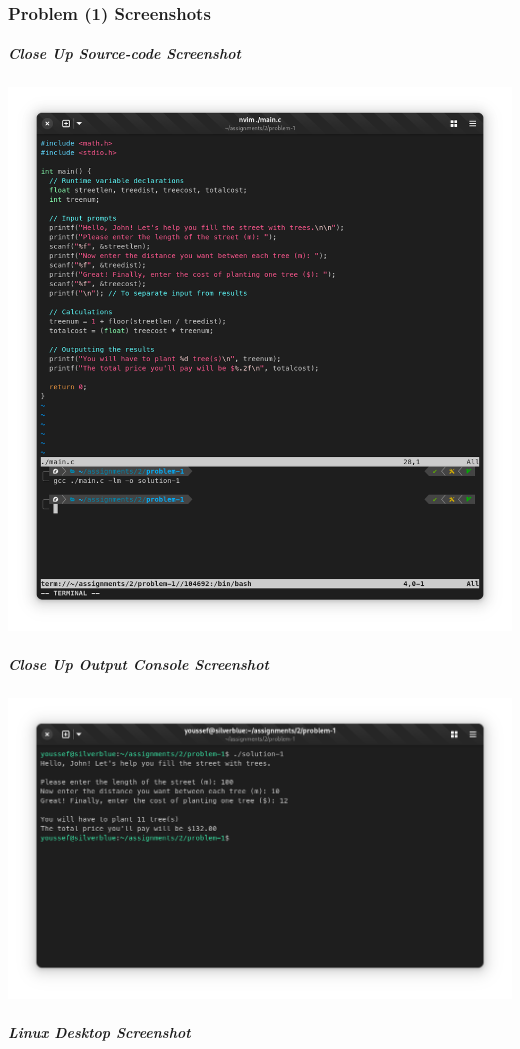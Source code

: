 \documentclass[a4paper,11pt]{article}
\theoremstyle{mytheor}
\begin{document}
\subsubsection{Problem (1) Screenshots}
\subparagraph{Close Up Source-code Screenshot\\}
\includegraphics[width=1\linewidth,center]{src-1.png}
\subparagraph{Close Up Output Console Screenshot\\}
\includegraphics[width=1\linewidth,center]{out-1.png}
\subparagraph{Linux Desktop Screenshot\\\\}
\end{document}
